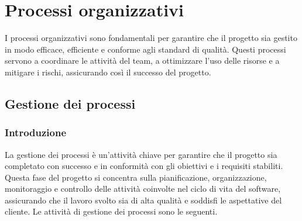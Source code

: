 \section{Processi organizzativi}
I processi organizzativi sono fondamentali per garantire che il progetto sia gestito in modo efficace, efficiente e conforme agli standard di qualità. Questi processi servono a coordinare le attività del team, a ottimizzare l'uso delle risorse e a mitigare i rischi, assicurando così il successo del progetto. 
\subsection{Gestione dei processi}
\subsubsection{Introduzione}
La gestione dei processi è un'attività chiave per garantire che il progetto sia completato con successo e in conformità con gli obiettivi e i requisiti stabiliti. Questa fase del progetto si concentra sulla pianificazione, organizzazione, monitoraggio e controllo delle attività coinvolte nel ciclo di vita del software, assicurando che il lavoro svolto sia di alta qualità e soddisfi le aspettative del cliente. Le attività di gestione dei processi sono le seguenti.
